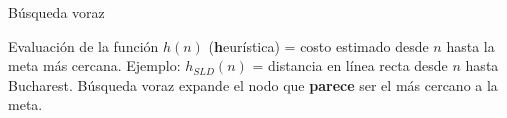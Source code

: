 \begin{frame}{Búsqueda voraz}
\begin{center}
Evaluación de la función \(h(n)\) (\textbf{h}eurística) = costo estimado desde \(n\) hasta la meta más cercana.  \newline
\newline
Ejemplo: \(h_{SLD}(n)\) = distancia en línea recta desde \(n\) hasta Bucharest. \newline
\newline
Búsqueda voraz expande el nodo que \textbf{parece} ser el más cercano a la meta.
\end{center}
\end{frame}
 
